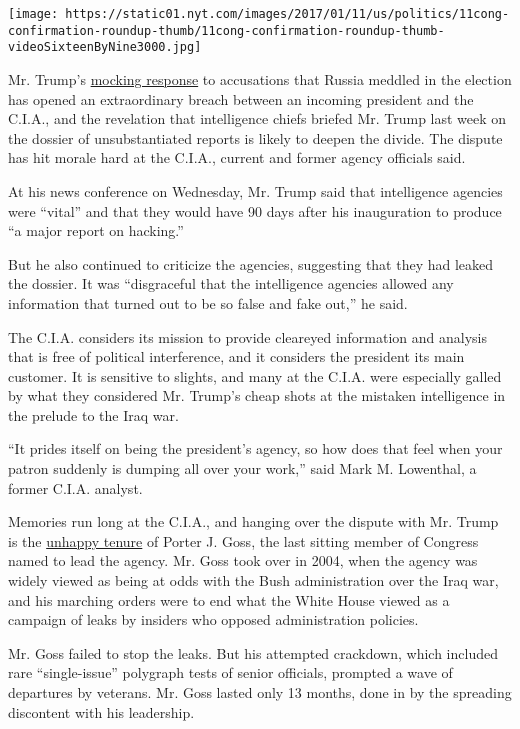 \texttt{[image: https://static01.nyt.com/images/2017/01/11/us/politics/11cong-confirmation-roundup-thumb/11cong-confirmation-roundup-thumb-videoSixteenByNine3000.jpg]}

Mr. Trump's
\href{https://www.nytimes.com/2016/12/10/us/politics/trump-mocking-claim-that-russia-hacked-election-at-odds-with-gop.html}{mocking
response} to accusations that Russia meddled in the election has opened
an extraordinary breach between an incoming president and the C.I.A.,
and the revelation that intelligence chiefs briefed Mr. Trump last week
on the dossier of unsubstantiated reports is likely to deepen the
divide. The dispute has hit morale hard at the C.I.A., current and
former agency officials said.

At his news conference on Wednesday, Mr. Trump said that intelligence
agencies were ``vital'' and that they would have 90 days after his
inauguration to produce ``a major report on hacking.''

But he also continued to criticize the agencies, suggesting that they
had leaked the dossier. It was ``disgraceful that the intelligence
agencies allowed any information that turned out to be so false and fake
out,'' he said.

The C.I.A. considers its mission to provide cleareyed information and
analysis that is free of political interference, and it considers the
president its main customer. It is sensitive to slights, and many at the
C.I.A. were especially galled by what they considered Mr. Trump's cheap
shots at the mistaken intelligence in the prelude to the Iraq war.

``It prides itself on being the president's agency, so how does that
feel when your patron suddenly is dumping all over your work,'' said
Mark M. Lowenthal, a former C.I.A. analyst.

Memories run long at the C.I.A., and hanging over the dispute with Mr.
Trump is the
\href{http://www.nytimes.com/2006/05/06/washington/06intel.html}{unhappy
tenure} of Porter J. Goss, the last sitting member of Congress named to
lead the agency. Mr. Goss took over in 2004, when the agency was widely
viewed as being at odds with the Bush administration over the Iraq war,
and his marching orders were to end what the White House viewed as a
campaign of leaks by insiders who opposed administration policies.

Mr. Goss failed to stop the leaks. But his attempted crackdown, which
included rare ``single-issue'' polygraph tests of senior officials,
prompted a wave of departures by veterans. Mr. Goss lasted only 13
months, done in by the spreading discontent with his leadership.

